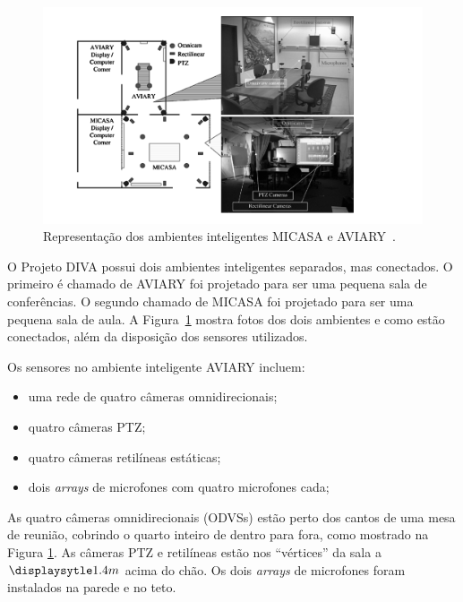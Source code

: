 	\begin{figure}[hbt]
		\begin{center}
	\includegraphics[scale=0.5]{figuras/3.TrabalhosCorrelatos/micasa_aviary.png}
		\end{center}
		\caption{Representação dos ambientes inteligentes MICASA e AVIARY~\cite{trivedi}.}
		\label{micasa_aviary}
	\end{figure}

O Projeto DIVA possui dois ambientes inteligentes separados, mas conectados. O primeiro é chamado de AVIARY foi projetado para ser uma pequena sala de conferências. O segundo chamado de MICASA foi projetado para ser uma pequena sala de aula. A Figura~\ref{micasa_aviary} mostra fotos dos dois ambientes e como estão conectados, além da disposição dos sensores utilizados.

Os sensores no ambiente inteligente AVIARY incluem:

	\begin{itemize}
		\item uma rede de quatro câmeras omnidirecionais;
		\item quatro câmeras PTZ;
		\item quatro câmeras retilíneas estáticas;
		\item dois \textit{arrays} de microfones com quatro microfones cada;
	\end{itemize}

As quatro câmeras omnidirecionais (ODVSs) estão perto dos cantos de uma mesa de reunião, cobrindo o quarto inteiro de dentro para fora, como mostrado na Figura \ref{micasa_aviary}. As câmeras PTZ e retilíneas estão nos ``vértices'' da sala a $\displaysytle 1.4m$ acima do chão. Os dois \textit{arrays} de microfones foram instalados na parede e no teto.


